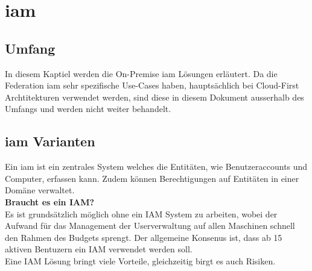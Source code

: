 \chapter{\acrfull{iam}}


\section{Umfang}
In diesem Kaptiel werden die On-Premise \acrfull{iam} Lösungen erläutert.
Da die Federation \acrshort{iam} sehr spezifische Use-Cases haben, hauptsächlich bei Cloud-First Archtitekturen verwendet werden, sind diese in diesem Dokument ausserhalb des Umfangs und werden nicht weiter behandelt.

\section{\acrshort{iam} Varianten}
Ein \acrfull{iam} ist ein zentrales System welches die Entitäten, wie Benutzeraccounts und Computer, erfassen kann. Zudem können Berechtigungen auf Entitäten in einer Domäne verwaltet.\\

\textbf{Braucht es ein IAM?}\\
Es ist grundsätzlich möglich ohne ein IAM System zu arbeiten, wobei der Aufwand für das Management der Userverwaltung auf allen Maschinen schnell den Rahmen des Budgets sprengt.
Der allgemeine Konsenus ist, dass ab 15 aktiven Bentuzern ein IAM verwendet werden soll.\\

Eine IAM Lösung bringt viele Vorteile, gleichzeitig birgt es auch Risiken.\\

